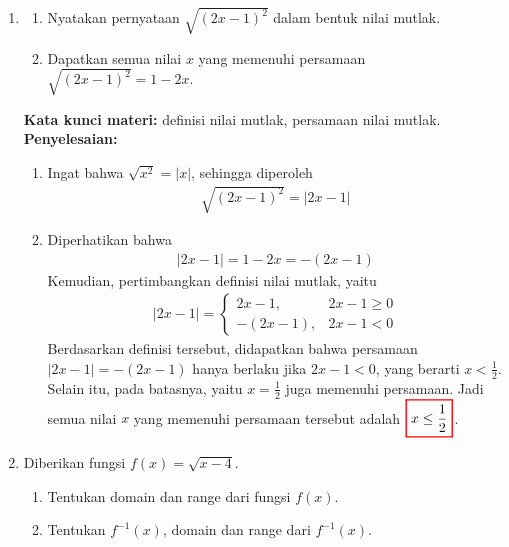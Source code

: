 \documentclass[10pt,openany,a4paper]{article}
\theoremstyle{definition}
\theoremstyle{definition}
\theoremstyle{plain}
\newenvironment{jawab}[2][tes]{
\textbf{Kata kunci materi:} #1.\\
\textbf{Penyelesaian:} #2
}{}
\begin{document}
\begin{enumerate}
    \item \begin{enumerate}
        \item Nyatakan pernyataan $\sqrt{(2x-1)^2}$ dalam bentuk nilai mutlak.
        \item Dapatkan semua nilai $x$ yang memenuhi persamaan $\sqrt{(2x-1)^2}=1-2x$.
    \end{enumerate}
    \begin{jawab}[definisi nilai mutlak, persamaan nilai mutlak]{
        \begin{enumerate}
            \item Ingat bahwa $\sqrt{x^2}=|x|$, sehingga diperoleh
            \begin{align*}
                \sqrt{(2x-1)^2} = |2x-1|
            \end{align*}
            \item Diperhatikan bahwa 
            \begin{align*}
                |2x-1| = 1-2x = -(2x-1)
            \end{align*}
            Kemudian, pertimbangkan definisi nilai mutlak, yaitu
            \begin{align*}
                |2x-1| = \begin{cases}
                    2x-1, & 2x-1 \geq 0\\
                    -(2x-1), & 2x-1 < 0
                \end{cases}
            \end{align*}
            Berdasarkan definisi tersebut, didapatkan bahwa persamaan $|2x-1| = -(2x-1)$ hanya berlaku jika $2x-1 < 0$, yang berarti $x < \frac{1}{2}$. Selain itu, pada batasnya, yaitu $x=\frac{1}{2}$ juga memenuhi persamaan. Jadi semua nilai $x$ yang memenuhi persamaan tersebut adalah $\colorlet{oldcolor}{.}
        \color{red}
        \setlength{\fboxrule}{1pt} \boxed{\color{oldcolor}x \leq \frac{1}{2}}\color{oldcolor}$.
        \end{enumerate}
    }
    \end{jawab}
    \item Diberikan fungsi $f(x)=\sqrt{x-4}$.
    \begin{enumerate}
        \item Tentukan domain dan range dari fungsi $f(x)$.
        \item Tentukan $f^{-1}(x)$, domain dan range dari $f^{-1}(x)$.
    \end{enumerate}

\end{enumerate}
\end{document}
